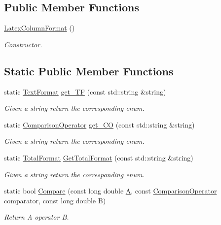 \subsection*{Public Member Functions}
\begin{DoxyCompactItemize}
\item 
\hyperlink{classTranslator_1_1LatexColumnFormat_a3054be2e9706a9fa08afa57bd3647752}{Latex\+Column\+Format} ()
\begin{DoxyCompactList}\small\item\em Constructor. \end{DoxyCompactList}\end{DoxyCompactItemize}
\subsection*{Static Public Member Functions}
\begin{DoxyCompactItemize}
\item 
static \hyperlink{classTranslator_1_1LatexColumnFormat_a3e57341308ef433ca03cb41faa3e6c00}{Text\+Format} \hyperlink{classTranslator_1_1LatexColumnFormat_a79cff52c30fc3086aedcff72a10c484a}{get\+\_\+\+TF} (const std\+::string \&string)
\begin{DoxyCompactList}\small\item\em Given a string return the corresponding enum. \end{DoxyCompactList}\item 
static \hyperlink{classTranslator_1_1LatexColumnFormat_a9401c4c02f92f224268e919aac9cb15e}{Comparison\+Operator} \hyperlink{classTranslator_1_1LatexColumnFormat_af10e7ab79455734a336a329306fd3428}{get\+\_\+\+CO} (const std\+::string \&string)
\begin{DoxyCompactList}\small\item\em Given a string return the corresponding enum. \end{DoxyCompactList}\item 
static \hyperlink{classTranslator_1_1LatexColumnFormat_a0754fb96fce28c9f04a8ef5353eede60}{Total\+Format} \hyperlink{classTranslator_1_1LatexColumnFormat_a278f02e75127b9616f1c1ce3f7c1ec50}{Get\+Total\+Format} (const std\+::string \&string)
\begin{DoxyCompactList}\small\item\em Given a string return the corresponding enum. \end{DoxyCompactList}\item 
static bool \hyperlink{classTranslator_1_1LatexColumnFormat_a71f62496a17eda4608c4666d00efb27f}{Compare} (const long double \hyperlink{tutorial__pnnl__2019_2memory_2third_2solution_2mips_8c_a5bbae38a6853eac231d3bb734d82fe8f}{A}, const \hyperlink{classTranslator_1_1LatexColumnFormat_a9401c4c02f92f224268e919aac9cb15e}{Comparison\+Operator} comparator, const long double B)
\begin{DoxyCompactList}\small\item\em Return A operator B. \end{DoxyCompactList}\end{DoxyCompactItemize}

